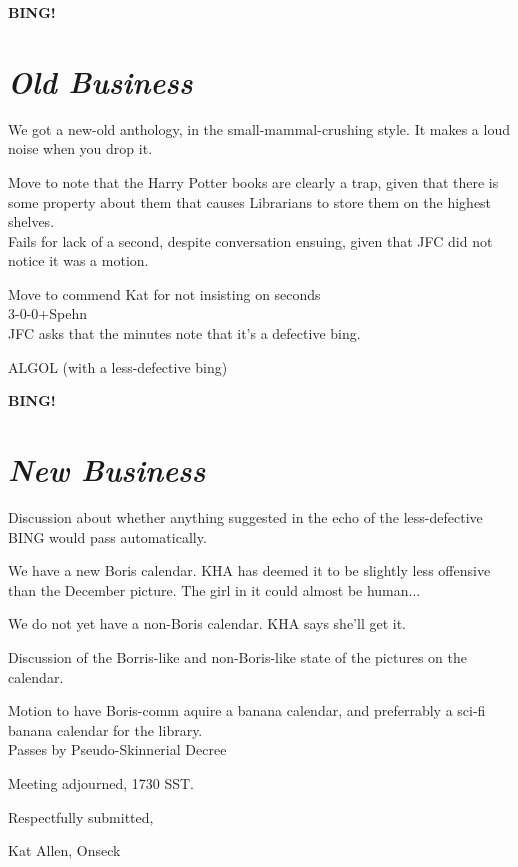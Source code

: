 \documentclass[10pt]{article}
\newcommand{\bing}{{\bf BING!} }
\newcommand{\goto}[1]{\bing \vskip 12pt \section*{{\em{#1}}}}
\begin{document}
\goto{Old Business}
We got a new-old anthology, in the small-mammal-crushing style. It
makes a loud noise when you drop it.

Move to note that the Harry Potter books are clearly a trap, given
that there is some property about them that causes Librarians to store
them on the highest shelves.\\
Fails for lack of a second, despite conversation ensuing, given that
JFC did not notice it was a motion.

Move to commend Kat for not insisting on seconds \\
3-0-0+Spehn\\
JFC asks that the minutes note that it's a defective bing.

ALGOL (with a less-defective bing)

\goto{New Business}
Discussion about whether anything suggested in the echo of the
less-defective BING would pass automatically.  

We have a new Boris calendar. KHA has deemed it to be slightly less
offensive than the December picture.  The girl in it could almost be human...

We do not yet have a non-Boris calendar. KHA says she'll get it.

Discussion of the Borris-like and non-Boris-like state of the pictures
on the calendar.

Motion to have Boris-comm aquire a banana calendar, and preferrably a
sci-fi banana calendar for the library.  \\
Passes by Pseudo-Skinnerial Decree

\noindent
Meeting adjourned, 1730 SST.

\vspace{18pt}

\centerline{Respectfully submitted,}
\centerline{Kat Allen,  Onseck}
\end{document}
